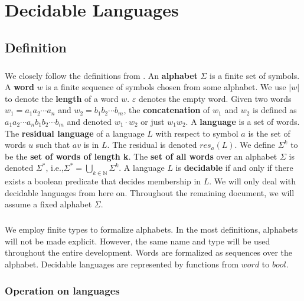 \chapter{Decidable Languages}

\section{Definition}
\paragraph{}
We closely follow the definitions from \cite{DBLP:books/daglib/0011126}.
An \textbf{alphabet} $\Sigma$ is a finite set of symbols. 
A \textbf{word} $w$ is a finite sequence of symbols chosen from some alphabet. 
We use $|w|$ to denote the \textbf{length} of a word $w$. $\varepsilon$ denotes the empty word.
Given two words $w_1 = a_1 a_2 \cdots a_n$ and $w_2 = b_1 b_2 \cdots b_m$, the \textbf{concatenation} of $w_1$ and $w_2$ is defined as $a_1 a_2 \cdots a_n b_1 b_2 \cdots b_m$ and denoted $w_1 \cdot w_2$ or just $w_1 w_2$.
A \textbf{language} is a set of words.
The \textbf{residual language} of a language $L$ with respect to symbol $a$ is the set of words $u$ such that $a v$ is in $L$. The residual is denoted $res_a(L)$.
We define $\Sigma^k$ to be the \textbf{set of words of length k}.
The \textbf{set of all words} over an alphabet $\Sigma$ is denoted $\Sigma^*$, i.e.,$\Sigma^* = \bigcup_{k \in \mathbb{N}} \Sigma^k$.
A language $L$ is \textbf{decidable} if and only if there exists a boolean predicate that decides membership in $L$.
We will only deal with decidable languages from here on.
Throughout the remaining document, we will assume a fixed alphabet $\Sigma$.

    \paragraph{} 
    We employ finite types to formalize alphabets. 
    In the most definitions, alphabets will not be made explicit.
    However, the same name and type will be used throughout the entire development.
    Words are formalized as sequences over the alphabet.
    Decidable languages are represented by functions from $word$ to $bool$.

    \subsection{Operation on languages}

